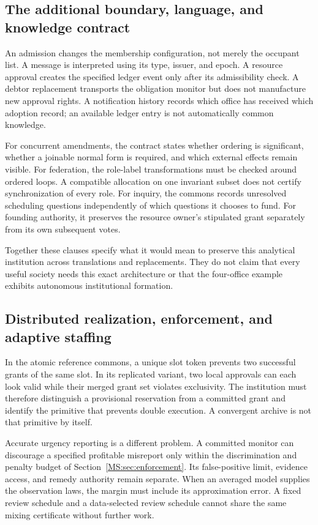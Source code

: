 \documentclass[11pt,oneside,openany]{book}
\numberwithin{equation}{section}
\begin{document}
\subsection{The additional boundary, language, and knowledge contract}
An admission changes the membership configuration, not merely the occupant list. A message is interpreted using its type, issuer, and epoch. A resource approval creates the specified ledger event only after its admissibility check. A debtor replacement transports the obligation monitor but does not manufacture new approval rights. A notification history records which office has received which adoption record; an available ledger entry is not automatically common knowledge.

For concurrent amendments, the contract states whether ordering is significant, whether a joinable normal form is required, and which external effects remain visible. For federation, the role-label transformations must be checked around ordered loops. A compatible allocation on one invariant subset does not certify synchronization of every role. For inquiry, the commons records unresolved scheduling questions independently of which questions it chooses to fund. For founding authority, it preserves the resource owner's stipulated grant separately from its own subsequent votes.

Together these clauses specify what it would mean to preserve this analytical institution across translations and replacements. They do not claim that every useful society needs this exact architecture or that the four-office example exhibits autonomous institutional formation.

\subsection{Distributed realization, enforcement, and adaptive staffing}
In the atomic reference commons, a unique slot token prevents two successful grants of the same slot. In its replicated variant, two local approvals can each look valid while their merged grant set violates exclusivity. The institution must therefore distinguish a provisional reservation from a committed grant and identify the primitive that prevents double execution. A convergent archive is not that primitive by itself.

Accurate urgency reporting is a different problem. A committed monitor can discourage a specified profitable misreport only within the discrimination and penalty budget of Section~\ref{MS:sec:enforcement}. Its false-positive limit, evidence access, and remedy authority remain separate. When an averaged model supplies the observation laws, the margin must include its approximation error. A fixed review schedule and a data-selected review schedule cannot share the same mixing certificate without further work.
\end{document}
